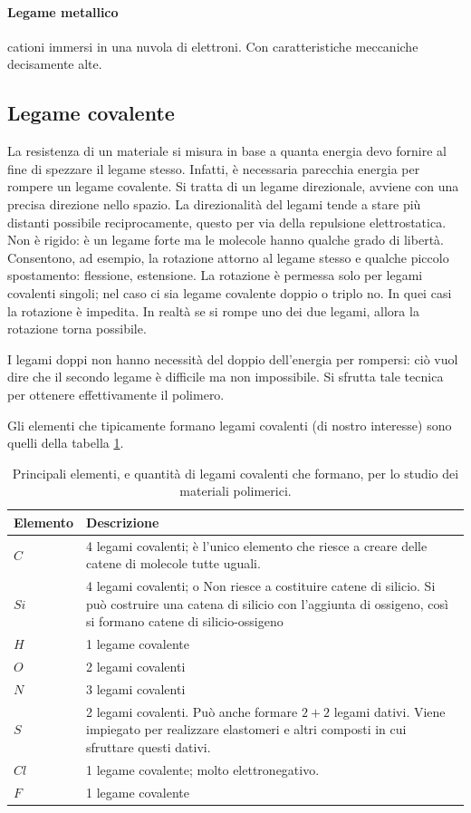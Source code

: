 \paragraph{Legame metallico} cationi immersi in una nuvola di elettroni. Con caratteristiche meccaniche decisamente alte.

\subsection{Legame covalente}
La resistenza di un materiale si misura in base a quanta energia devo fornire al fine di spezzare il legame stesso. Infatti, è necessaria parecchia energia per rompere un legame covalente.
Si tratta di un legame direzionale, avviene con una precisa direzione nello spazio.
La direzionalità del legami tende a stare più distanti possibile reciprocamente, questo per via della repulsione elettrostatica. Non è rigido: è un legame forte ma le molecole hanno qualche grado di libertà.
Consentono, ad esempio, la rotazione attorno al legame stesso e qualche piccolo spostamento: flessione, estensione.
La rotazione è permessa solo per legami covalenti singoli; nel caso ci sia legame covalente doppio o triplo no. In quei casi la rotazione è impedita. In realtà se si rompe uno dei due legami, allora la rotazione torna possibile.

I legami doppi non hanno necessità del doppio dell'energia per rompersi: ciò vuol dire che il secondo legame è difficile ma non impossibile.
Si sfrutta tale tecnica per ottenere effettivamente il polimero.

Gli elementi che tipicamente formano legami covalenti (di nostro interesse) sono quelli della tabella \ref{tab:ElementiPolimerici}.

\begin{table}
\centering
\caption{Principali elementi, e quantità di legami covalenti che formano, per lo studio dei materiali polimerici.}
\label{tab:ElementiPolimerici}
\begin{tabularx}{\textwidth}{lX}
\toprule
\textbf{Elemento} & \textbf{Descrizione}\\
\midrule
$C$ & 4 legami covalenti; è l'unico elemento che riesce a creare delle catene di molecole tutte uguali.\\
$Si$ & 4 legami covalenti; o	Non riesce a costituire catene di silicio. Si può costruire una catena di silicio con l'aggiunta di ossigeno, così si formano catene di silicio-ossigeno\\
$H$ & 1 legame covalente\\
$O$ & 2 legami covalenti\\
$N$ & 3 legami covalenti\\
$S$ & 2 legami covalenti. Può anche formare $2 + 2$ legami dativi. Viene impiegato per realizzare elastomeri e altri composti in cui sfruttare questi dativi.\\
$Cl$ & 1 legame covalente; molto elettronegativo.\\
$F$ & 1 legame covalente\\
\bottomrule
\end{tabularx}
\end{table}

